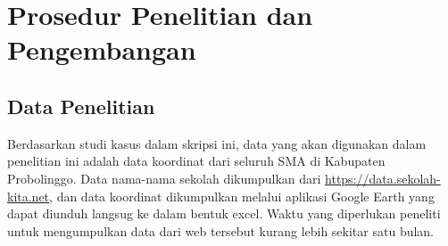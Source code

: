 \section{Prosedur Penelitian dan Pengembangan}


\subsection{Data Penelitian}
    
Berdasarkan studi kasus dalam skripsi ini, data yang akan digunakan dalam penelitian ini adalah data koordinat dari seluruh SMA di Kabupaten Probolinggo. Data nama-nama sekolah dikumpulkan dari \url{https://data.sekolah-kita.net}, dan data koordinat dikumpulkan melalui aplikasi Google Earth yang dapat diunduh langsug ke dalam bentuk excel. Waktu yang diperlukan peneliti untuk mengumpulkan data dari web tersebut kurang lebih sekitar satu bulan.

